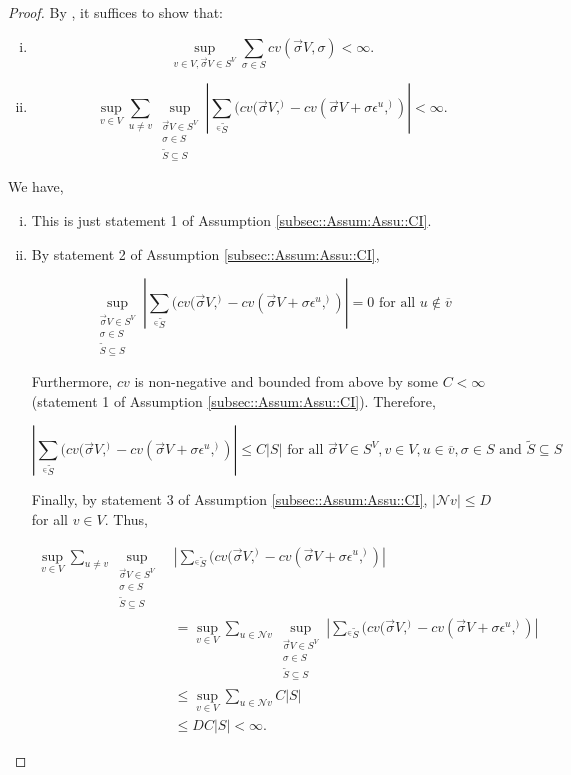 \documentclass[12pt]{article}
\newcommand{\mc}{\mathcal}
\newcommand{\ov}{\overline}
\newcommand{\te}{\text}
\newcommand{\ep}{\epsilon}
\renewcommand{\v}{v}							%
\newcommand{\vv}{u}								%
\renewcommand{\S}{S}							%
\newcommand{\s}{\sigma}							%
\newcommand{\sv}{\vec{\s}}						%
\newcommand{\ev}[1]{\ep^{#1}}					%
\newcommand{\IGr}{c}							%
\newcommand{\neigh}{\mc{N}}						%
\newcommand{\cl}{\ov}							%
\renewcommand{\ss}[1]{^{#1}}					%
\newcommand{\const}{C}							%
\newcommand{\degr}{D}							%
\renewcommand{\SS}{\tilde{\S}}						%
\newcommand{\XState}[1]{\S^{#1}}				%
\begin{document}
\begin{proof}
By \cite[Theorem 3.9 (a) and (b)]{Lig85}, it suffices to show that:

\begin{enumerate}[i)]
\item 

\[\sup_{\v \in  V,\sv{}{ V} \in \S^ V} \sum_{\s \in \S} \IGr{\v}(\sv{}{ V},\s) < \infty.\]

\item 

\[\sup_{\v\in  V}\sum_{\vv\neq \v} \sup_{\substack{\sv{}{ V} \in \S^ V\\ \s\in \S\\ \SS \subseteq \S}} \left|\sum_{\ss \in \SS} (\IGr{\v}(\sv{}{ V},\ss) - \IGr{\v}(\sv{}{ V}+\s \ev{\vv},\ss))\right| < \infty.\]
\end{enumerate}

We have,

\begin{enumerate}[i)]
\item This is just statement 1 of Assumption \ref{subsec::Assum:Assu::CI}.

\item By statement 2 of Assumption \ref{subsec::Assum:Assu::CI}, 

\[\sup_{\substack{\sv{}{ V} \in \S^ V\\ \s\in \S\\ \SS\subseteq \S}} \left|\sum_{\ss \in \SS} (\IGr{\v}(\sv{}{ V},\ss) - \IGr{\v}(\sv{}{ V}+\s \ev{\vv},\ss))\right| = 0 \te{ for all } \vv \notin \cl{\v}\]

Furthermore, \(\IGr{\v}\) is non-negative and bounded from above by some \(\const{} < \infty\) (statement 1 of Assumption \ref{subsec::Assum:Assu::CI}). Therefore, 

\[\left|\sum_{\ss \in \SS} (\IGr{\v}(\sv{}{ V},\ss) - \IGr{\v}(\sv{}{ V}+\s\ev{\vv},\ss))\right| \leq \const{}|\S| \te{ for all } \sv{}{ V} \in \S^ V,\v \in  V, \vv \in \cl{\v}, \s \in \S \te{ and } \SS\subseteq \S\]

Finally, by statement 3 of Assumption \ref{subsec::Assum:Assu::CI}, \(|\neigh{\v}| \leq \degr\) for all \(\v \in  V\). Thus,

\begin{align*}
\sup_{\v\in  V}\sum_{\vv \neq \v} \sup_{\substack{\sv{}{ V} \in \S^ V\\ \s\in \S\\ \SS\subseteq \S}}& \left|\sum_{\ss \in \SS} (\IGr{\v}(\sv{}{ V},\ss) - \IGr{\v}(\sv{}{ V}+\s\ev{\vv},\ss))\right|\\
&  = \sup_{\v\in  V}\sum_{\vv\in \neigh{\v}} \sup_{\substack{\sv{}{ V} \in \S^ V\\ \s\in \S\\ \SS\subseteq \S}} \left|\sum_{\ss \in \SS} (\IGr{\v}(\sv{}{ V},\ss) - \IGr{\v}(\sv{}{ V}+\s\ev{\vv},\ss))\right|\\
&\leq \sup_{\v\in  V} \sum_{\vv \in \neigh{\v}} \const{}|\S|\\
&\leq \degr \const{}|\S| < \infty.
\end{align*}


\end{enumerate}
\end{proof}
\end{document}
